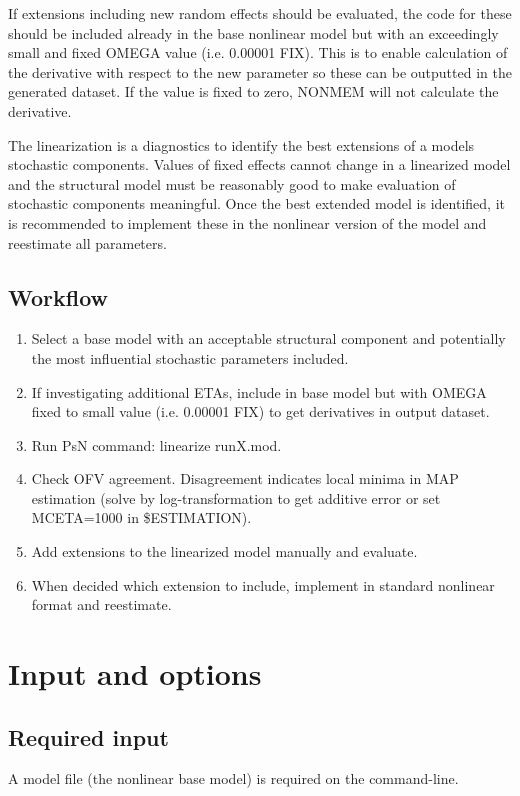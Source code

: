 If extensions including new random effects should be evaluated, the code for these should be included already in the base nonlinear model but with an 
exceedingly small and fixed OMEGA value (i.e. 0.00001 FIX). This is to enable calculation of the derivative with respect to the new parameter so these can 
be outputted in the generated dataset. If the value is fixed to zero, NONMEM will not calculate the derivative. 

The linearization is a diagnostics to identify the best extensions of a models stochastic components. Values of fixed effects cannot change in a linearized
model and the structural model must be reasonably good to make evaluation of stochastic components meaningful. Once the best extended model is identified, 
it is recommended to implement these in the nonlinear version of the model and reestimate all parameters.


\subsection{Workflow}
\begin{enumerate}
\item Select a base model with an acceptable structural component and potentially the most influential stochastic parameters included.
\item If investigating additional ETAs, include in base model but with OMEGA fixed to small value (i.e. 0.00001 FIX) to get derivatives in output dataset.
\item Run PsN command: linearize runX.mod.
\item Check OFV agreement. Disagreement indicates local minima in MAP estimation (solve by log-transformation to get additive error or set MCETA=1000 in \$ESTIMATION).
\item Add extensions to the linearized model manually and evaluate.
\item When decided which extension to include, implement in standard nonlinear format and reestimate.
\end{enumerate}

\section{Input and options}
\subsection{Required input}
A model file (the nonlinear base model) is required on the command-line.

